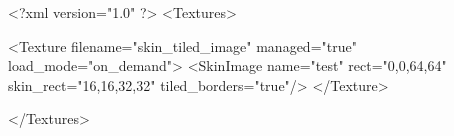 <?xml version="1.0" ?>
<Textures>

	<Texture filename="skin_tiled_image" managed="true" load_mode="on_demand">
		<SkinImage name="test" rect="0,0,64,64" skin_rect="16,16,32,32" tiled_borders="true"/>
	</Texture>
	
</Textures>
